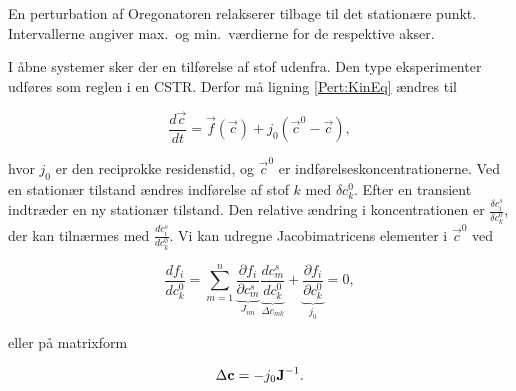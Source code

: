 {
\caption{\protect\capsize
En perturbation af Oregonatoren relakserer tilbage til det
station{\ae}re punkt. Intervallerne angiver max.\ og min.\
v{\ae}rdierne for de respektive akser.}
\label{pert:Oregon}
}

I {\aa}bne systemer sker der en tilf{\o}relse af stof
udenfra. Den type eksperimenter udf{\o}res som
reglen i en CSTR. Derfor m{\aa} ligning \ref{Pert:KinEq}
{\ae}ndres til

\begin{equation}
\label{Pert:CSTR}
\frac{d\vec{c}}{dt} = \vec{f}(\vec{c}) + j_0(\vec{c}^0 - \vec{c}),
\end{equation}

hvor $j_0$ er den reciprokke residenstid, og $\vec{c}^0$ er
indf{\o}relseskoncentrationerne. Ved en station{\ae}r
tilstand {\ae}ndres indf{\o}relse af stof $k$ med $\delta
c_k^0$. Efter en transient indtr{\ae}der en ny
station{\ae}r tilstand. Den relative {\ae}ndring i
koncentrationen er $\frac{\delta c_i^s}{\delta c_k^0}$, der
kan tiln{\ae}rmes med $\frac{d c_i^s}{d c_k^0}$. Vi kan
udregne Jacobimatricens elementer i $\vec{c}^0$ ved

\begin{equation}
\frac{d f_i}{d c_k^0} = \sum_{m=1}^n \underbrace{\frac{\partial f_i}{\partial
c_m^s}}_{J_{im}} \underbrace{\frac{d c_m^s}{d c_k^0}}_{\Delta c_{mk}} +
\underbrace{\frac{\partial f_i}{\partial c_k^0}}_{j_0} = 0,
\end{equation}

eller p{\aa} matrixform

\begin{equation}
\Delta\mbox{${\bf c}$} = -j_0\mbox{${\bf J}$}^{-1}.
\end{equation}

